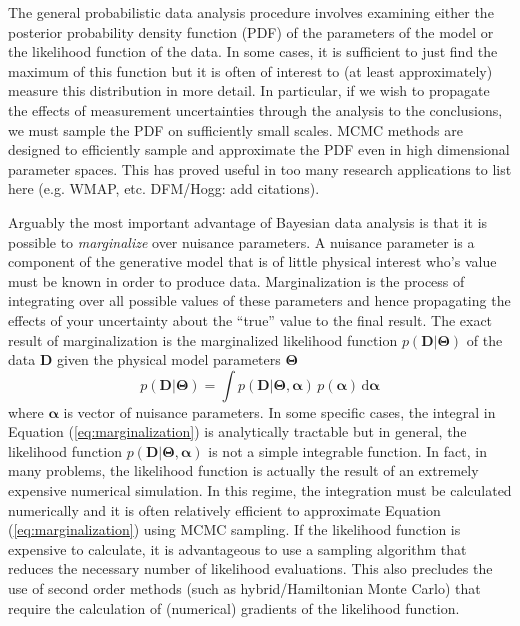 \documentclass[12pt,preprint]{aastex}
\newcommand{\eq}[1]{Equation (\ref{eq:#1})}
\newcommand{\eqlabel}[1]{\label{eq:#1}}
\newcommand{\dd}{\mathrm{d}}
\newcommand{\bvec}[1]{\boldsymbol{#1}}
\newcommand{\paramvector}[1]{\bvec{#1}}
\newcommand{\model}{\paramvector{\Theta}}
\newcommand{\data}{\paramvector{D}}
\newcommand{\nuisance}{\paramvector{\alpha}}
\begin{document}
The general probabilistic data analysis procedure involves examining either
the posterior probability density function (PDF) of the parameters
of the model or the likelihood function of the data. In some cases, it is
sufficient to just find the maximum of this function but it is often of
interest to (at least approximately) measure this distribution in more detail.
In particular, if we wish to propagate the effects of measurement
uncertainties through the analysis to the conclusions, we must sample the
PDF on sufficiently small scales. MCMC methods are designed to efficiently
sample and approximate the PDF even in high dimensional
parameter spaces. This has proved useful in too many research
applications to list here (e.g. WMAP, etc. DFM/Hogg: add citations).

Arguably the most important advantage of Bayesian data analysis is
that it is possible to \emph{marginalize} over nuisance parameters. A
nuisance parameter is a component of the generative model that is of little
physical interest who's value must be known in order to produce data.
Marginalization is the process of integrating over all possible values of
these parameters and hence propagating the effects of your uncertainty about
the ``true'' value to the final result. The exact result of marginalization
is the marginalized likelihood function $p(\mathbf{D}|\boldsymbol{\Theta})$
of the data $\mathbf{D}$ given the physical model parameters
$\boldsymbol{\Theta}$
\begin{equation}
    \eqlabel{marginalization}
    p (\data | \model) = \int
        p (\data | \model, \nuisance) \,
        p ( \nuisance) \, \dd  \nuisance
\end{equation}
where $ \nuisance$ is vector of nuisance parameters. In some specific
cases, the integral in \eq{marginalization} is analytically tractable but in
general, the likelihood function
$p (\data | \model, \nuisance)$ is not a simple
integrable function. In fact, in many problems, the likelihood
function is actually the result of an extremely expensive numerical
simulation. In this regime, the integration must be calculated numerically
and it is often relatively efficient to approximate \eq{marginalization}
using MCMC sampling. If the likelihood function is expensive to
calculate, it is advantageous to use a sampling algorithm that reduces the
necessary number of likelihood evaluations. This also precludes the use of
second order methods (such as hybrid/Hamiltonian Monte Carlo) that require
the calculation of (numerical) gradients of the likelihood function.
\end{document}
